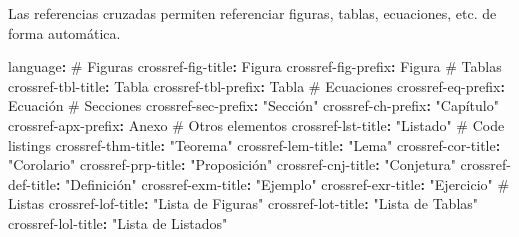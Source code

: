 \documentclass[
  doc,
  floatsintext,
  longtable,
  a4paper,
  nolmodern,
  notxfonts,
  notimes,
  12pt,
  colorlinks=true,linkcolor=blue,citecolor=blue,urlcolor=blue]{apa7}
\newenvironment{Shaded}{\begin{snugshade}}{\end{snugshade}}
\newcommand{\AttributeTok}[1]{\textcolor[rgb]{0.40,0.45,0.13}{#1}}
\newcommand{\CommentTok}[1]{\textcolor[rgb]{0.37,0.37,0.37}{#1}}
\newcommand{\FunctionTok}[1]{\textcolor[rgb]{0.28,0.35,0.67}{#1}}
\newcommand{\KeywordTok}[1]{\textcolor[rgb]{0.00,0.23,0.31}{\textbf{#1}}}
\newcommand{\StringTok}[1]{\textcolor[rgb]{0.13,0.47,0.30}{#1}}
\begin{document}
Las referencias cruzadas permiten referenciar figuras, tablas,
ecuaciones, etc. de forma automática.

\begin{Shaded}
\begin{Highlighting}[]
\FunctionTok{language}\KeywordTok{:}
\CommentTok{  \# Figuras}
\AttributeTok{  }\FunctionTok{crossref{-}fig{-}title}\KeywordTok{:}\AttributeTok{ Figura}
\AttributeTok{  }\FunctionTok{crossref{-}fig{-}prefix}\KeywordTok{:}\AttributeTok{ Figura}
\AttributeTok{  }
\CommentTok{  \# Tablas}
\AttributeTok{  }\FunctionTok{crossref{-}tbl{-}title}\KeywordTok{:}\AttributeTok{ Tabla}
\AttributeTok{  }\FunctionTok{crossref{-}tbl{-}prefix}\KeywordTok{:}\AttributeTok{ Tabla}
\AttributeTok{  }
\CommentTok{  \# Ecuaciones}
\AttributeTok{  }\FunctionTok{crossref{-}eq{-}prefix}\KeywordTok{:}\AttributeTok{ Ecuación}
\AttributeTok{  }
\CommentTok{  \# Secciones}
\AttributeTok{  }\FunctionTok{crossref{-}sec{-}prefix}\KeywordTok{:}\AttributeTok{ }\StringTok{"Sección"}
\AttributeTok{  }\FunctionTok{crossref{-}ch{-}prefix}\KeywordTok{:}\AttributeTok{ }\StringTok{"Capítulo"}
\AttributeTok{  }\FunctionTok{crossref{-}apx{-}prefix}\KeywordTok{:}\AttributeTok{ Anexo}
\AttributeTok{  }
\CommentTok{  \# Otros elementos}
\AttributeTok{  }\FunctionTok{crossref{-}lst{-}title}\KeywordTok{:}\AttributeTok{ }\StringTok{"Listado"}\CommentTok{         \# Code listings}
\AttributeTok{  }\FunctionTok{crossref{-}thm{-}title}\KeywordTok{:}\AttributeTok{ }\StringTok{"Teorema"}
\AttributeTok{  }\FunctionTok{crossref{-}lem{-}title}\KeywordTok{:}\AttributeTok{ }\StringTok{"Lema"}
\AttributeTok{  }\FunctionTok{crossref{-}cor{-}title}\KeywordTok{:}\AttributeTok{ }\StringTok{"Corolario"}
\AttributeTok{  }\FunctionTok{crossref{-}prp{-}title}\KeywordTok{:}\AttributeTok{ }\StringTok{"Proposición"}
\AttributeTok{  }\FunctionTok{crossref{-}cnj{-}title}\KeywordTok{:}\AttributeTok{ }\StringTok{"Conjetura"}
\AttributeTok{  }\FunctionTok{crossref{-}def{-}title}\KeywordTok{:}\AttributeTok{ }\StringTok{"Definición"}
\AttributeTok{  }\FunctionTok{crossref{-}exm{-}title}\KeywordTok{:}\AttributeTok{ }\StringTok{"Ejemplo"}
\AttributeTok{  }\FunctionTok{crossref{-}exr{-}title}\KeywordTok{:}\AttributeTok{ }\StringTok{"Ejercicio"}
\AttributeTok{  }
\CommentTok{  \# Listas}
\AttributeTok{  }\FunctionTok{crossref{-}lof{-}title}\KeywordTok{:}\AttributeTok{ }\StringTok{"Lista de Figuras"}
\AttributeTok{  }\FunctionTok{crossref{-}lot{-}title}\KeywordTok{:}\AttributeTok{ }\StringTok{"Lista de Tablas"}
\AttributeTok{  }\FunctionTok{crossref{-}lol{-}title}\KeywordTok{:}\AttributeTok{ }\StringTok{"Lista de Listados"}
\end{Highlighting}
\end{Shaded}
\end{document}
